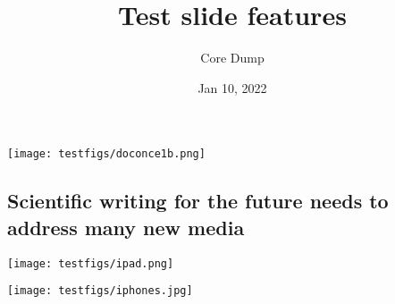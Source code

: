 \documentclass[%
oneside,                 %
final,                   %
10pt]{article}
\newcounter{doconce:movie:counter}
\begin{document}

\newcommand{\exercisesection}[1]{\subsection*{#1}}








\title{Test slide features}


\author{Core Dump}

\date{Jan 10, 2022
}

\vspace{6mm}

\centerline{\texttt{[image: testfigs/doconce1b.png]}}

\vspace{6mm}


\subsection{Scientific writing for the future needs to address many new media}


\vspace{6mm}

\centerline{\texttt{[image: testfigs/ipad.png]}}

\vspace{6mm}

\vspace{6mm}

\centerline{\texttt{[image: testfigs/iphones.jpg]}}

\vspace{6mm}


\end{document}

